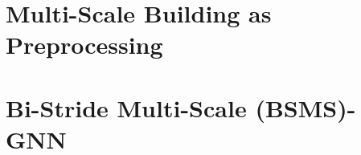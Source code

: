 \section{Multi-Scale Building as Preprocessing}
\label{sec:preproc}

\section{Bi-Stride Multi-Scale (BSMS)-GNN}


